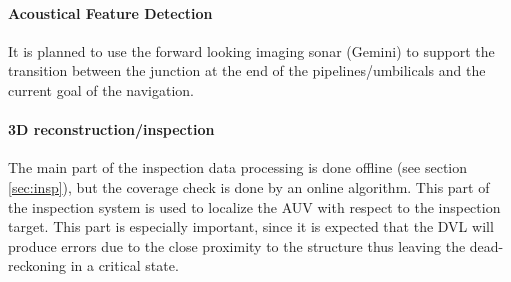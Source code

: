 \documentclass[conference]{IEEEtran}
\begin{document}
\paragraph*{\textbf{Acoustical Feature Detection}} It is planned to use the forward looking 
imaging sonar (Gemini) to support the transition between the junction at the end of the 
pipelines/umbilicals and the current goal of the navigation.
\paragraph*{\textbf{3D reconstruction/inspection}} The main part of the inspection data 
processing is done offline (see section \ref{sec:insp}), but the coverage check is done by an 
online algorithm. This part of the inspection system is used to localize the AUV with respect 
to the inspection target. This part is especially important, since it is expected that the DVL 
will produce errors due to the close proximity to the structure thus leaving the 
dead-reckoning in a critical state.
\end{document}

